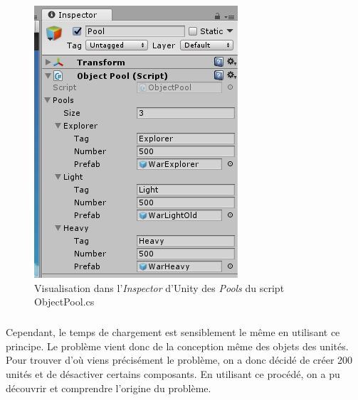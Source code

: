 \documentclass{report}
\begin{document}
\begin{figure}[!h]
\centering
\includegraphics{ObjectPoolingImage}
\caption{Visualisation dans l'\textit{Inspector} d'Unity des \textit{Pools} du script ObjectPool.cs}
\end{figure}

\subparagraph{} Cependant, le temps de chargement est sensiblement le même en utilisant ce principe. Le problème vient donc de la conception même des objets des unités. \newline
Pour trouver d’où viens précisément le problème, on a donc décidé de créer 200 unités et de désactiver certains composants. En utilisant ce procédé, on a pu découvrir et comprendre l'origine du problème.
\end{document}
